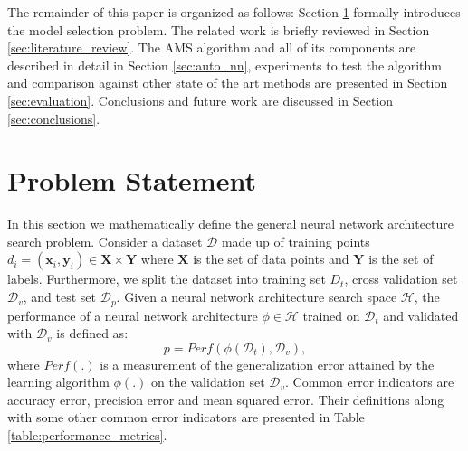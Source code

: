 \documentclass[preprint,12pt]{elsarticle}%
\begin{document}
The remainder of this paper is organized as follows: Section \ref{sec:model_selection} formally introduces the model selection problem. The related work is briefly reviewed in Section \ref{sec:literature_review}. The AMS algorithm and all of its components are described in detail in Section \ref{sec:auto_nn}, experiments to test the algorithm and comparison against other state of the art methods are presented in Section \ref{sec:evaluation}. Conclusions and future work are discussed in Section \ref{sec:conclusions}.


\section{Problem Statement}
\label{sec:model_selection}

In this section we mathematically define the general neural network architecture search problem. Consider a dataset $\mathcal{D}$ made up of training points $d_i = (\mathbf{x}_i, \mathbf{y}_i) \in \mathbf{X} \times \mathbf{Y}$ where $\mathbf{X}$ is the set of data points and $\mathbf{Y}$ is the set of labels. Furthermore, we split the dataset into training set $D_t$, cross validation set $\mathcal{D}_v$, and test set $\mathcal{D}_p$. Given a neural network architecture search space $\mathcal{H}$, the performance of a neural network architecture $\phi \in \mathcal{H}$ trained on $\mathcal{D}_t$ and validated with  $\mathcal{D}_v$ is defined as:
\begin{equation}
p = {Perf}(\phi(\mathcal{D}_t), \mathcal{D}_v),
\label{eq:nn_cost}
\end{equation}
where ${Perf}(.)$ is a measurement of the generalization error attained by the learning algorithm $\phi(.)$ on the validation set $\mathcal{D}_v$. Common error indicators are accuracy error, precision error and mean squared error. Their definitions along with some other common error indicators are presented in Table \ref{table:performance_metrics}. 
\end{document}
